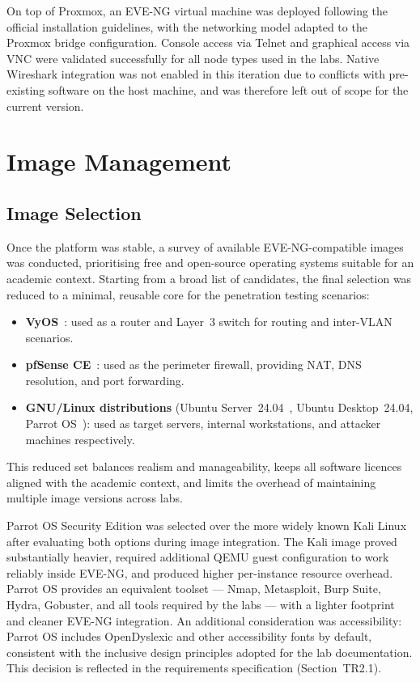 On top of Proxmox, an EVE-NG virtual machine was deployed following the official
installation guidelines, with the networking model adapted to the Proxmox bridge
configuration. Console access via Telnet and graphical access via VNC were validated
successfully for all node types used in the labs. Native Wireshark integration was
not enabled in this iteration due to conflicts with pre-existing software on the host
machine, and was therefore left out of scope for the current version.


\section{Image Management}

\subsection{Image Selection}

Once the platform was stable, a survey of available EVE-NG-compatible images was
conducted, prioritising free and open-source operating systems suitable for an
academic context. Starting from a broad list of candidates, the final selection
was reduced to a minimal, reusable core for the penetration testing scenarios:

\begin{itemize}
    \item \textbf{VyOS}~\cite{vyos}: used as a router and Layer~3 switch for routing and
          inter-VLAN scenarios.
    \item \textbf{pfSense CE}~\cite{pfsense}: used as the perimeter firewall, providing NAT,
          DNS resolution, and port forwarding.
    \item \textbf{GNU/Linux distributions} (Ubuntu Server~24.04~\cite{ubuntu}, Ubuntu
          Desktop~24.04, Parrot OS~\cite{parrot_os}): used as target servers, internal workstations,
          and attacker machines respectively.
\end{itemize}

This reduced set balances realism and manageability, keeps all software licences
aligned with the academic context, and limits the overhead of maintaining multiple
image versions across labs.

Parrot OS Security Edition was selected over the more widely known Kali
Linux~\cite{kali_linux} after evaluating both options during image integration.
The Kali image proved substantially heavier, required additional QEMU guest
configuration to work reliably inside EVE-NG, and produced higher per-instance
resource overhead. Parrot OS provides an equivalent toolset --- Nmap, Metasploit,
Burp Suite, Hydra, Gobuster, and all tools required by the labs --- with a
lighter footprint and cleaner EVE-NG integration. An additional consideration
was accessibility: Parrot OS includes OpenDyslexic and other accessibility fonts
by default, consistent with the inclusive design principles adopted for the lab
documentation. This decision is reflected in the requirements specification
(Section~TR2.1).


